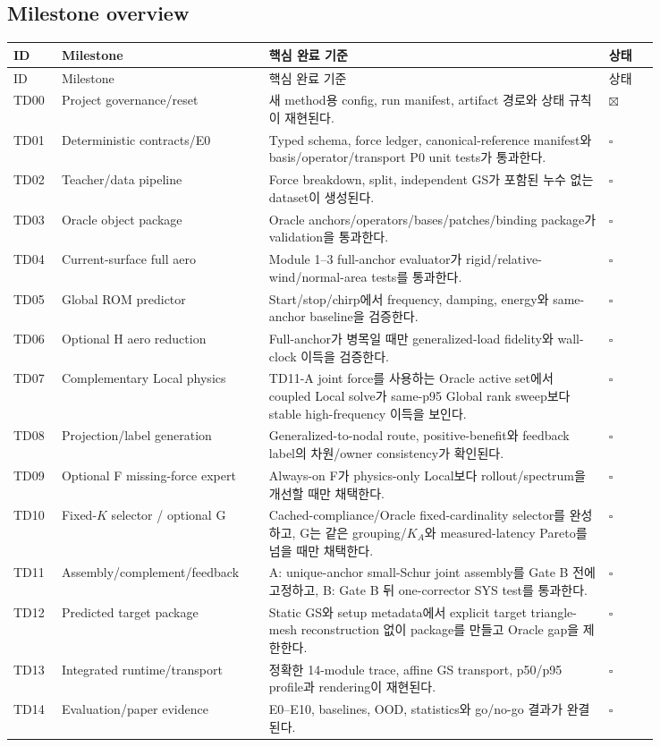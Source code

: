 \documentclass[10pt,a4paper]{article}
\newcommand{\todo}{\textcolor{TodoGray}{\(\square\)}}
\newcommand{\done}{\textcolor{DoneGreen}{\(\boxtimes\)}}
\begin{document}
\subsection{Milestone overview}

\small
\begin{longtable}{L{0.065\linewidth}L{0.235\linewidth}L{0.47\linewidth}L{0.075\linewidth}}
\toprule
ID & Milestone & 핵심 완료 기준 & 상태 \\
\midrule
\endfirsthead
\toprule
ID & Milestone & 핵심 완료 기준 & 상태 \\
\midrule
\endhead
TD00 & Project governance/reset & 새 method용 config, run manifest, artifact 경로와 상태 규칙이 재현된다. & \done \\
TD01 & Deterministic contracts/E0 & Typed schema, force ledger, canonical-reference manifest와 basis/operator/transport P0 unit tests가 통과한다. & \todo \\
TD02 & Teacher/data pipeline & Force breakdown, split, independent GS가 포함된 누수 없는 dataset이 생성된다. & \todo \\
TD03 & Oracle object package & Oracle anchors/operators/bases/patches/binding package가 validation을 통과한다. & \todo \\
TD04 & Current-surface full aero & Module 1--3 full-anchor evaluator가 rigid/relative-wind/normal-area tests를 통과한다. & \todo \\
TD05 & Global ROM predictor & Start/stop/chirp에서 frequency, damping, energy와 same-anchor baseline을 검증한다. & \todo \\
TD06 & Optional H aero reduction & Full-anchor가 병목일 때만 generalized-load fidelity와 wall-clock 이득을 검증한다. & \todo \\
TD07 & Complementary Local physics & TD11-A joint force를 사용하는 Oracle active set에서 coupled Local solve가 same-p95 Global rank sweep보다 stable high-frequency 이득을 보인다. & \todo \\
TD08 & Projection/label generation & Generalized-to-nodal route, positive-benefit와 feedback label의 차원/owner consistency가 확인된다. & \todo \\
TD09 & Optional F missing-force expert & Always-on F가 physics-only Local보다 rollout/spectrum을 개선할 때만 채택한다. & \todo \\
TD10 & Fixed-\(K\) selector / optional G & Cached-compliance/Oracle fixed-cardinality selector를 완성하고, G는 같은 grouping/\(K_A\)와 measured-latency Pareto를 넘을 때만 채택한다. & \todo \\
TD11 & Assembly/complement/feedback & A: unique-anchor small-Schur joint assembly를 Gate B 전에 고정하고, B: Gate B 뒤 one-corrector SYS test를 통과한다. & \todo \\
TD12 & Predicted target package & Static GS와 setup metadata에서 explicit target triangle-mesh reconstruction 없이 package를 만들고 Oracle gap을 제한한다. & \todo \\
TD13 & Integrated runtime/transport & 정확한 14-module trace, affine GS transport, p50/p95 profile과 rendering이 재현된다. & \todo \\
TD14 & Evaluation/paper evidence & E0--E10, baselines, OOD, statistics와 go/no-go 결과가 완결된다. & \todo \\
\bottomrule
\end{longtable}
\end{document}
